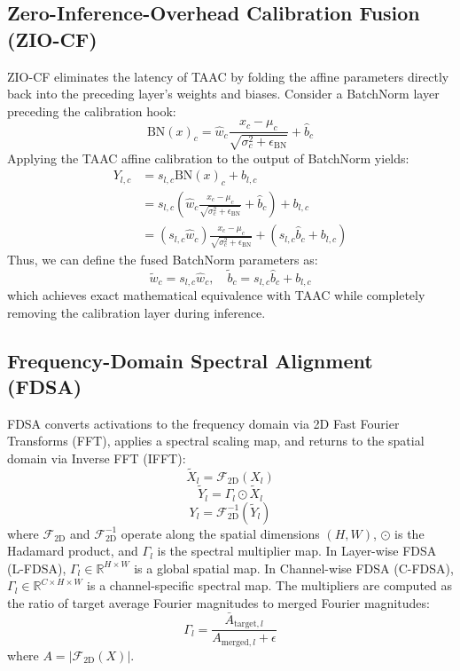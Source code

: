 \documentclass{article}
\theoremstyle{plain}
\theoremstyle{definition}
\theoremstyle{remark}
\begin{document}
\subsection{Zero-Inference-Overhead Calibration Fusion (ZIO-CF)}
ZIO-CF eliminates the latency of TAAC by folding the affine parameters directly back into the preceding layer's weights and biases. Consider a BatchNorm layer preceding the calibration hook:
\begin{equation}
    \text{BN}(x)_c = \hat{w}_c \frac{x_c - \mu_c}{\sqrt{\sigma_c^2 + \epsilon_{\text{BN}}}} + \hat{b}_c
\end{equation}
Applying the TAAC affine calibration to the output of BatchNorm yields:
\begin{align}
    Y_{l, c} &= s_{l, c} \text{BN}(x)_c + b_{l, c} \nonumber \\
    &= s_{l, c} \left( \hat{w}_c \frac{x_c - \mu_c}{\sqrt{\sigma_c^2 + \epsilon_{\text{BN}}}} + \hat{b}_c \right) + b_{l, c} \nonumber \\
    &= (s_{l, c} \hat{w}_c) \frac{x_c - \mu_c}{\sqrt{\sigma_c^2 + \epsilon_{\text{BN}}}} + (s_{l, c} \hat{b}_c + b_{l, c})
\end{align}
Thus, we can define the fused BatchNorm parameters as:
\begin{equation}
    \tilde{w}_c = s_{l, c} \hat{w}_c, \quad \tilde{b}_c = s_{l, c} \hat{b}_c + b_{l, c}
\end{equation}
which achieves exact mathematical equivalence with TAAC while completely removing the calibration layer during inference.

\subsection{Frequency-Domain Spectral Alignment (FDSA)}
FDSA converts activations to the frequency domain via 2D Fast Fourier Transforms (FFT), applies a spectral scaling map, and returns to the spatial domain via Inverse FFT (IFFT):
\begin{equation}
    \tilde{X}_{l} = \mathcal{F}_{\text{2D}}(X_l)
\end{equation}
\begin{equation}
    \tilde{Y}_{l} = \Gamma_l \odot \tilde{X}_{l}
\end{equation}
\begin{equation}
    Y_l = \mathcal{F}_{\text{2D}}^{-1}(\tilde{Y}_{l})
\end{equation}
where $\mathcal{F}_{\text{2D}}$ and $\mathcal{F}_{\text{2D}}^{-1}$ operate along the spatial dimensions $(H, W)$, $\odot$ is the Hadamard product, and $\Gamma_l$ is the spectral multiplier map. In Layer-wise FDSA (L-FDSA), $\Gamma_l \in \mathbb{R}^{H \times W}$ is a global spatial map. In Channel-wise FDSA (C-FDSA), $\Gamma_l \in \mathbb{R}^{C \times H \times W}$ is a channel-specific spectral map. The multipliers are computed as the ratio of target average Fourier magnitudes to merged Fourier magnitudes:
\begin{equation}
    \Gamma_{l} = \frac{\bar{A}_{\text{target}, l}}{A_{\text{merged}, l} + \epsilon}
\end{equation}
where $A = |\mathcal{F}_{\text{2D}}(X)|$.
\end{document}
